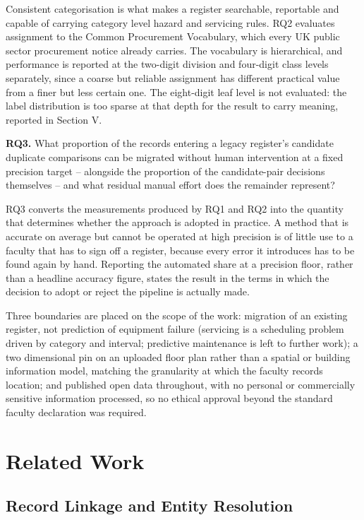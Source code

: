 \documentclass[conference]{IEEEtran}
\begin{document}
Consistent categorisation is what makes a register searchable,
reportable and capable of carrying category level hazard and servicing
rules. RQ2 evaluates assignment to the Common Procurement Vocabulary,
which every UK public sector procurement notice already carries. The
vocabulary is hierarchical, and performance is reported at the two-digit
division and four-digit class levels separately, since a coarse but
reliable assignment has different practical value from a finer but less
certain one. The eight-digit leaf level is not evaluated: the label
distribution is too sparse at that depth for the result to carry
meaning, reported in Section V.

\textbf{RQ3.} What proportion of the records entering a legacy
register's candidate duplicate comparisons can be migrated without
human intervention at a fixed precision target -- alongside the
proportion of the candidate-pair decisions themselves -- and what
residual manual effort does the remainder represent?

RQ3 converts the measurements produced by RQ1 and RQ2 into the quantity
that determines whether the approach is adopted in practice. A method
that is accurate on average but cannot be operated at high precision is
of little use to a faculty that has to sign off a register, because
every error it introduces has to be found again by hand. Reporting the
automated share at a precision floor, rather than a headline accuracy
figure, states the result in the terms in which the decision to adopt or
reject the pipeline is actually made.

Three boundaries are placed on the scope of the work: migration of an
existing register, not prediction of equipment failure (servicing is a
scheduling problem driven by category and interval; predictive
maintenance is left to further work); a two dimensional pin on an
uploaded floor plan rather than a spatial or building information
model, matching the granularity at which the faculty records location;
and published open data throughout, with no personal or commercially
sensitive information processed, so no ethical approval beyond the
standard faculty declaration was required.

\section{Related Work}

\subsection{Record Linkage and Entity Resolution}
\end{document}
